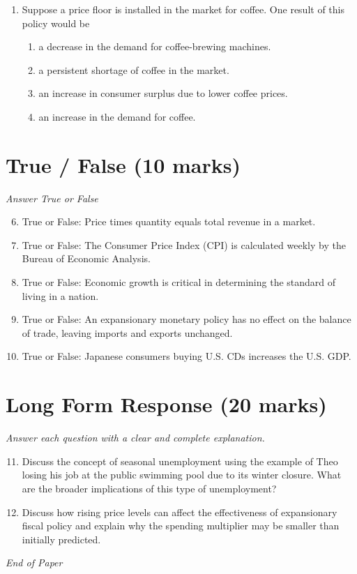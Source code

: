 \documentclass[12pt]{article}
\begin{document}
\begin{enumerate}[label=\arabic*.]
\begin{enumerate}[label=(\alph*)]
    \item Differentiated products
    \item Patents and copyrights
    \item Possibility of profit in the short run
    \item Deadweight loss exists
\end{enumerate}
\item Suppose a price floor is installed in the market for coffee. One result of this policy would be
\begin{enumerate}[label=(\alph*)]
    \item a decrease in the demand for coffee-brewing machines.
    \item a persistent shortage of coffee in the market.
    \item an increase in consumer surplus due to lower coffee prices.
    \item an increase in the demand for coffee.
\end{enumerate}
\end{enumerate}

\section*{True / False (10 marks)}
\textit{Answer True or False}
\begin{enumerate}[label=\arabic*.]
\setcounter{enumi}{5}
\item True or False: Price times quantity equals total revenue in a market.
\item True or False: The Consumer Price Index (CPI) is calculated weekly by the Bureau of Economic Analysis.
\item True or False: Economic growth is critical in determining the standard of living in a nation.
\item True or False: An expansionary monetary policy has no effect on the balance of trade, leaving imports and exports unchanged.
\item True or False: Japanese consumers buying U.S. CDs increases the U.S. GDP.
\end{enumerate}

\section*{Long Form Response (20 marks)}
\textit{Answer each question with a clear and complete explanation.}
\begin{enumerate}[label=\arabic*.]
\setcounter{enumi}{10}
\item Discuss the concept of seasonal unemployment using the example of Theo losing his job at the public swimming pool due to its winter closure. What are the broader implications of this type of unemployment?
\item Discuss how rising price levels can affect the effectiveness of expansionary fiscal policy and explain why the spending multiplier may be smaller than initially predicted.
\end{enumerate}

\vfill
\noindent\textit{End of Paper}
\end{document}
